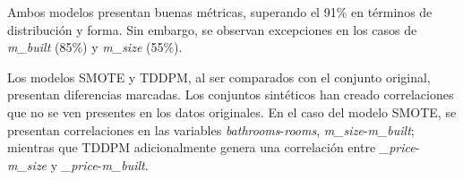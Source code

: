 
Ambos modelos presentan buenas métricas, superando el 91\% en términos de distribución y forma. Sin embargo, se observan excepciones en los casos de \emph{m\_built} (85\%) y \emph{m\_size} (55\%).


\newpage
Los modelos SMOTE y TDDPM, al ser comparados con el conjunto original, presentan diferencias marcadas. Los conjuntos sintéticos han creado correlaciones que no se ven presentes en los datos originales. En el caso del modelo SMOTE, se presentan correlaciones en las variables \emph{bathrooms}-\emph{rooms}, \emph{m\_size}-\emph{m\_built}; mientras que TDDPM adicionalmente genera una correlación entre \emph{\_price}-\emph{m\_size} y \emph{\_price}-\emph{m\_built}.




